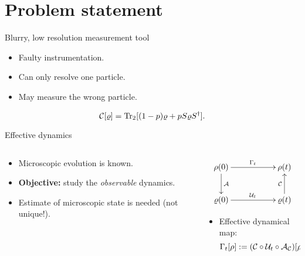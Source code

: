 \section{Problem statement}

\begin{frame}{Blurry, low resolution measurement tool}
    \begin{itemize}
        \item Faulty instrumentation.
        \item Can only resolve one particle.
        \item May measure the wrong particle.
    \end{itemize}
    \begin{equation*}
        \mathcal{C}[\varrho]=\Tr_{2}[(1-p)\varrho+pS\varrho S^{\dag}].
    \end{equation*}
\end{frame}

\begin{frame}{Effective dynamics}
    \begin{columns}
        \begin{column}{0.5\textwidth}
            \begin{itemize}
                \item Microscopic evolution is known.
                \item \textbf{Objective:} study the \textit{observable} dynamics.
                \item Estimate of microscopic state is needed (not unique!). 
            \end{itemize}
        \end{column}
        \begin{column}{0.5\textwidth}
            \begin{displaymath}
                \xymatrix{
                  {\rho(0)} \ar[rr]^{\Gamma_{t}} \ar[d]^{\mcA}
                  && {\rho(t)}\\
                  {\varrho(0)} \ar[rr]^{\mcU_{t}}
                  && {\varrho(t)} \ar[u]^{\mcC}
                }
              \end{displaymath}
              \begin{itemize}
              \item Effective dynamical map:
                \begin{equation*}
                    \Gamma_t[\rho]:=(\mathcal{C} \circ \mathcal{U}_t \circ \mathcal{A}_{\mathcal{C}})[\rho].
                \end{equation*}
            \end{itemize}
        \end{column}
    \end{columns}
\end{frame}